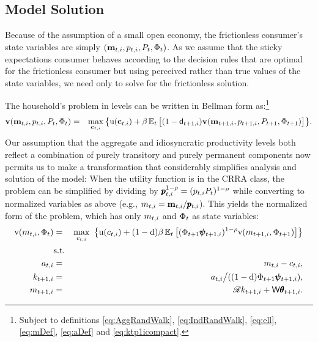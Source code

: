 \documentclass[titlepage]{./econtex}
\begin{document}
\subsection{Model Solution}

Because of the assumption of a small open economy, the frictionless consumer's state variables are simply $(\mathbf{m}_{t,i},p_{t,i},P_t,\Phi_t)$.  As we assume that the sticky expectations consumer behaves according to the decision rules that are optimal for the frictionless consumer but using perceived rather than true values of the state variables, we need only to solve for the frictionless solution.

The household's problem in levels can be written in Bellman form as:\footnote{Subject to definitions \eqref{eq:AggRandWalk}, \eqref{eq:IndRandWalk}, \eqref{eq:ell}, \eqref{eq:mDef}, \eqref{eq:aDef} and \eqref{eq:ktp1icompact}.}
\begin{eqnarray*}
\textbf{v}(\mathbf{m}_{t,i},p_{t,i},P_t,\Phi_t)  & = &  \max_{\mathbf{c}_{t,i}}  \big\{ {\mathrm{u}}(\mathbf{c}_{t,i}) + \beta \operatorname{\mathbb{E}}_t \big[(1-\mathsf{d}_{t+1,i})\textbf{v}(\mathbf{m}_{t+1,i},p_{t+1,i},P_{t+1},\Phi_{t+1})\big] \big\}. \nonumber
\end{eqnarray*}
Our assumption that the aggregate and idiosyncratic productivity levels both reflect a combination of purely transitory and purely permanent components now permits us to make a transformation that considerably simplifies analysis and solution of the model: When the utility function is in the CRRA class, the problem can be simplified by dividing by $\pmb{p}_{t,i}^{1-\rho} = (p_{t,i}P_t)^{1-\rho}$ while converting to normalized variables as above (e.g., $m_{t,i}=\mathbf{m}_{t,i}/\pmb{p}_{t,i}$). This yields the normalized form of the problem, which has only $m_{t,i}$ and $\Phi_t$ as state variables:
\begin{eqnarray}
    \mathrm{v}({m}_{t,i},\Phi_t) & = & \max_{c_{t,i}} ~ \big\{ {\mathrm{u}}(c_{t,i}) + (1-\mathrm{d}) \beta
    \operatorname{\mathbb{E}}_{t}\big[ (\Phi_{t+1} \pmb{\psi}_{t+1,i})^{1-\rho}\mathrm{v}(m_{t+1,i},\Phi_{t+1})\big] \big\}
    \label{eq:scaledv}
\\  & \mbox{s.t.} & \nonumber
\\    a_{t,i}   & = & m_{t,i} - c_{t,i}, \nonumber
\\    k_{t+1,i} & = & a_{t,i} \big/( (1-\mathrm{d}) \Phi_{t+1} \pmb{\psi}_{t+1,i} ),  \nonumber
\\    m_{t+1,i} & = & \mathscr{R} k_{t+1,i} + \mathsf{W} \pmb{\theta}_{t+1,i}.  \nonumber
\end{eqnarray}
 
\end{document}

